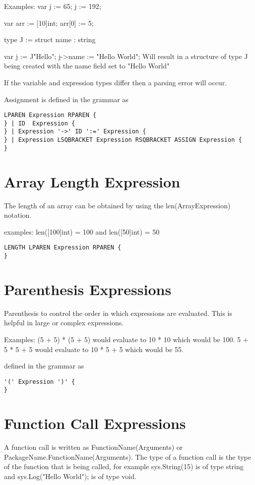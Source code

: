 \documentclass[]{final_report}
\begin{document}
Examples:
var j := 65;
j := 192;

var arr := [10]int;
arr[0] := 5;

type J := struct {
	name : string
}

var j := J{"Hello"};
j->name := "Hello World";
Will result in a structure of type J being created with the name field set to "Hello World"

If the variable and expression types differ then a parsing error will occur.

Assignment is defined in the grammar as
\begin{verbatim}
LPAREN Expression RPAREN {
} | ID  Expression {
} | Expression '->' ID ':=' Expression {
} | Expression LSQBRACKET Expression RSQBRACKET ASSIGN Expression {
} 
\end{verbatim}

\section{Array Length Expression}

The length of an array can be obtained by using the len(ArrayExpression) notation.

examples:
len([100]int) = 100 and len([50]int) = 50

\begin{verbatim}LENGTH LPAREN Expression RPAREN {
}
\end{verbatim}

\section{Parenthesis Expressions}

Parenthesis to control the order in which expressions are evaluated. This is helpful in large or complex expressions.

Examples: (5 + 5) * (5 + 5) would evaluate to 10 * 10 which would be 100. 5 + 5 * 5 + 5 would evaluate to 10 * 5 + 5 which would be 55.

defined in the grammar as
\begin{verbatim}
'(' Expression ')' {
}
\end{verbatim}

\section{Function Call Expressions}

A function call is written as FunctionName(Arguments) or PackageName.FunctionName(Arguments). The type of a function call is the type of the function that is being called, for example sys.String(15) is of type string and sys.Log("Hello World"); is of type void.
\end{document}
